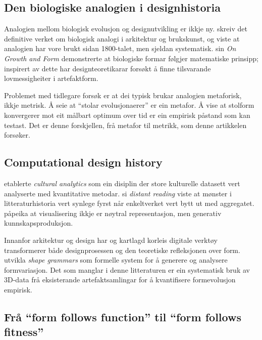 \documentclass[12pt,a4paper]{article}
\begin{document}
\subsection{Den biologiske analogien i designhistoria}

Analogien mellom biologisk evolusjon og designutvikling er ikkje ny. \citet{steadman1979,steadman2008} skreiv det definitive verket om biologisk analogi i arkitektur og brukskunst, og viste at analogien har vore brukt sidan 1800-talet, men sjeldan systematisk. \citet{thompson1917} sin \emph{On Growth and Form} demonstrerte at biologiske formar f\o{}lgjer matematiske prinsipp; inspirert av dette har designteoretikarar fors\o{}kt \aa{} finne tilsvarande lovmessigheiter i artefaktform.

Problemet med tidlegare fors\o{}k er at dei typisk brukar analogien metaforisk, ikkje metrisk. \AA{} seie at ``stolar evolusjonaerer'' er ein metafor. \AA{} vise at stolform konvergerer mot eit m\aa{}lbart optimum over tid er ein empirisk p\aa{}stand som kan testast. Det er denne forskjellen, fr\aa{} metafor til metrikk, som denne artikkelen fors\o{}ker.

\subsection{Computational design history}

\citet{manovich2020} etablerte \emph{cultural analytics} som ein disiplin der store kulturelle datasett vert analyserte med kvantitative metodar. \citet{moretti2005} si \emph{distant reading} viste at mønster i litteraturhistoria vert synlege fyrst n\aa{}r enkeltverket vert bytt ut med aggregatet. \citet{drucker2014} p\aa{}peika at visualisering ikkje er n\o{}ytral representasjon, men generativ kunnskapsproduksjon.

Innanfor arkitektur og design har \citet{oxman2006} og \citet{oxman2017} kartlagd korleis digitale verkt\o{}y transformerer b\aa{}de designprosessen og den teoretiske refleksjonen over form. \citet{gero1996} utvikla \emph{shape grammars} som formelle system for \aa{} generere og analysere formvariasjon. Det som manglar i denne litteraturen er ein systematisk bruk av 3D-data fr\aa{} eksisterande artefaktsamlingar for \aa{} kvantifisere formevolusjon empirisk.

\subsection{Fr\aa{} ``form follows function'' til ``form follows fitness''}
\end{document}

